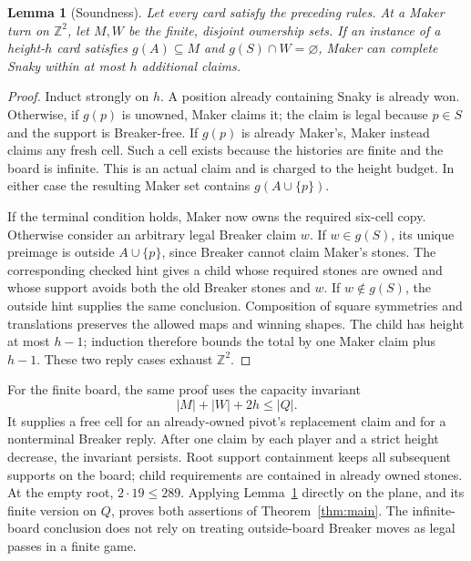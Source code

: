 \documentclass[11pt]{amsart}
\newtheorem{lemma}[theorem]{Lemma}
\newcommand{\Z}{\mathbb Z}
\begin{document}
\begin{lemma}[Soundness]\label{lem:soundness}
Let every card satisfy the preceding rules. At a Maker turn on $\Z^2$, let
$M,W$ be the finite, disjoint ownership sets. If an instance of a height-$h$
card satisfies $g(A)\subseteq M$ and $g(S)\cap W=\varnothing$, Maker can
complete Snaky within at most $h$ additional claims.
\end{lemma}
\begin{proof}
Induct strongly on $h$. A position already containing Snaky is already won.
Otherwise, if $g(p)$ is unowned, Maker claims it; the claim is legal because
$p\in S$ and the support is Breaker-free. If $g(p)$ is already Maker's, Maker
instead claims any fresh cell. Such a cell exists because the histories are
finite and the board is infinite. This is an actual claim and is charged to
the height budget. In either case the resulting Maker set contains
$g(A\cup\{p\})$.

If the terminal condition holds, Maker now owns the required six-cell copy.
Otherwise consider an arbitrary legal Breaker claim $w$. If $w\in g(S)$,
its unique preimage is outside $A\cup\{p\}$, since Breaker cannot claim
Maker's stones. The corresponding checked hint gives a child whose required
stones are owned and whose support avoids both the old Breaker stones and
$w$. If $w\notin g(S)$, the outside hint supplies the same conclusion.
Composition of square symmetries and translations preserves the allowed maps
and winning shapes. The child has height at most $h-1$; induction therefore
bounds the total by one Maker claim plus $h-1$. These two reply cases exhaust
$\Z^2$.
\end{proof}

For the finite board, the same proof uses the capacity invariant
\begin{equation}\label{eq:capacity}
 |M|+|W|+2h\leq |Q|.
\end{equation}
It supplies a free cell for an already-owned pivot's replacement claim and
for a nonterminal Breaker reply. After one claim by each player and a strict
height decrease, the invariant persists. Root support containment keeps all
subsequent supports on the board; child requirements are contained in already
owned stones. At the empty root, $2\cdot19\leq289$. Applying
Lemma~\ref{lem:soundness} directly on the plane, and its finite version on
$Q$, proves both assertions of Theorem~\ref{thm:main}. The infinite-board
conclusion does not rely on treating outside-board Breaker moves as legal
passes in a finite game.
\end{document}
